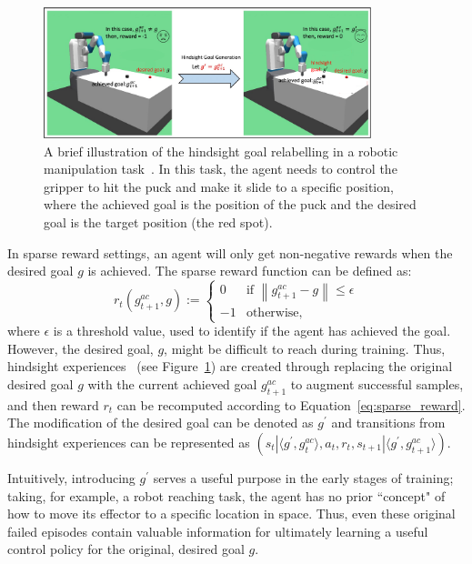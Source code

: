 \begin{figure}[h]
    \centering
    \includegraphics[width=0.85\textwidth]{figures/background/her_background_modified.pdf}
    \caption[A brief illustration of Hindsight Experience Replay (HER).]{A brief illustration of the hindsight goal relabelling in a robotic manipulation task~\cite{plappert2018multi}. In this task, the agent needs to control the gripper to hit the puck and make it slide to a specific position, where the achieved goal is the position of the puck and the desired goal is the target position (the red spot).}
    \label{fig:her_back}
\end{figure}
In sparse reward settings, an agent will only get non-negative rewards when the desired goal $g$ is achieved. The sparse reward function can be defined as:
\begin{equation}
r_{t}\left(g^{ac}_{t+1}, g\right):=
\begin{cases}
0& \text{if $\left\|g^{ac}_{t+1} - g\right\|\leq\epsilon$}\\
-1& \text{otherwise},
\end{cases}
\label{eq:sparse_reward}
\end{equation}
where $\epsilon$ is a threshold value, used to identify if the agent has achieved the goal. {However, the desired goal, $g$, might be difficult to reach during training. Thus, hindsight experiences~\cite{andrychowicz2017hindsight} (see Figure~\ref{fig:her_back}) are created through replacing the original desired goal $g$ with the current achieved goal $g_{t+1}^{ac}$ to augment successful samples, and then reward $r_{t}$ can be recomputed according to Equation~\eqref{eq:sparse_reward}. The modification of the desired goal can be denoted as $g^\prime$ and transitions from hindsight experiences can be represented as $(s_t|\langle g^\prime, g^{ac}_{t} \rangle, a_t, r_t, s_{t+1}|\langle g^\prime, g^{ac}_{t+1} \rangle)$.} 

Intuitively, introducing $g^\prime$ serves a useful purpose in the early stages of training; taking, for example, a robot reaching task, the agent has no prior ``concept" of how to move its effector to a specific location in space. Thus, even these original failed episodes contain valuable information for ultimately learning a useful control policy for the original, desired goal $g$.
\newpage

